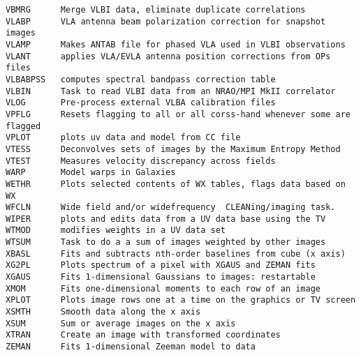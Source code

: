 \begin{verbatim}
VBMRG      Merge VLBI data, eliminate duplicate correlations
VLABP      VLA antenna beam polarization correction for snapshot images
VLAMP      Makes ANTAB file for phased VLA used in VLBI observations
VLANT      applies VLA/EVLA antenna position corrections from OPs files
VLBABPSS   computes spectral bandpass correction table
VLBIN      Task to read VLBI data from an NRAO/MPI MkII correlator
VLOG       Pre-process external VLBA calibration files
VPFLG      Resets flagging to all or all corss-hand whenever some are flagged
VPLOT      plots uv data and model from CC file
VTESS      Deconvolves sets of images by the Maximum Entropy Method
VTEST      Measures velocity discrepancy across fields
WARP       Model warps in Galaxies
WETHR      Plots selected contents of WX tables, flags data based on WX
WFCLN      Wide field and/or widefrequency  CLEANing/imaging task.
WIPER      plots and edits data from a UV data base using the TV
WTMOD      modifies weights in a UV data set
WTSUM      Task to do a a sum of images weighted by other images
XBASL      Fits and subtracts nth-order baselines from cube (x axis)
XG2PL      Plots spectrum of a pixel with XGAUS and ZEMAN fits
XGAUS      Fits 1-dimensional Gaussians to images: restartable
XMOM       Fits one-dimensional moments to each row of an image
XPLOT      Plots image rows one at a time on the graphics or TV screen
XSMTH      Smooth data along the x axis
XSUM       Sum or average images on the x axis
XTRAN      Create an image with transformed coordinates
ZEMAN      Fits 1-dimensional Zeeman model to data
\end{verbatim}\eve



